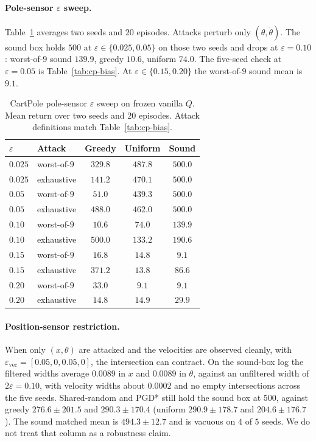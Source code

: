 \documentclass[10pt,twocolumn]{article}
\begin{document}
\paragraph{Pole-sensor $\varepsilon$ sweep.}
Table~\ref{tab:cp-eps} averages two seeds and $20$ episodes.
Attacks perturb only $(\theta,\dot\theta)$.
The sound box holds $500$ at $\varepsilon\in\{0.025,0.05\}$ on those two seeds and drops at $\varepsilon{=}0.10$: worst-of-$9$ sound $139.9$, greedy $10.6$, uniform $74.0$.
The five-seed check at $\varepsilon{=}0.05$ is Table~\ref{tab:cp-bias}.
At $\varepsilon\in\{0.15,0.20\}$ the worst-of-$9$ sound mean is $9.1$.

\begin{table}[h]
\centering
\small
\caption{CartPole pole-sensor $\varepsilon$ sweep on frozen vanilla $Q$.
Mean return over two seeds and $20$ episodes.
Attack definitions match Table~\ref{tab:cp-bias}.}
\label{tab:cp-eps}
\setlength{\tabcolsep}{3.5pt}
\begin{tabular}{@{}llccc@{}}
\toprule
$\varepsilon$ & Attack & Greedy & Uniform & Sound \\
\midrule
$0.025$ & worst-of-$9$ & $329.8$ & $487.8$ & $500.0$ \\
$0.025$ & exhaustive & $141.2$ & $470.1$ & $500.0$ \\
$0.05$ & worst-of-$9$ & $51.0$ & $439.3$ & $500.0$ \\
$0.05$ & exhaustive & $488.0$ & $462.0$ & $500.0$ \\
$0.10$ & worst-of-$9$ & $10.6$ & $74.0$ & $139.9$ \\
$0.10$ & exhaustive & $500.0$ & $133.2$ & $190.6$ \\
$0.15$ & worst-of-$9$ & $16.8$ & $14.8$ & $9.1$ \\
$0.15$ & exhaustive & $371.2$ & $13.8$ & $86.6$ \\
$0.20$ & worst-of-$9$ & $33.0$ & $9.1$ & $9.1$ \\
$0.20$ & exhaustive & $14.8$ & $14.9$ & $29.9$ \\
\bottomrule
\end{tabular}
\end{table}

\paragraph{Position-sensor restriction.}
When only $(x,\theta)$ are attacked and the velocities are observed cleanly, with $\varepsilon_{\mathrm{vec}}=[0.05,0,0.05,0]$, the intersection can contract.
On the sound-box log the filtered widths average $0.0089$ in $x$ and $0.0089$ in $\theta$, against an unfiltered width of $2\varepsilon=0.10$, with velocity widths about $0.0002$ and no empty intersections across the five seeds.
Shared-random and PGD* still hold the sound box at $500$, against greedy $276.6{\pm}201.5$ and $290.3{\pm}170.4$ (uniform $290.9{\pm}178.7$ and $204.6{\pm}176.7$).
The sound matched mean is $494.3{\pm}12.7$ and is vacuous on $4$ of $5$ seeds.
We do not treat that column as a robustness claim.
\end{document}
